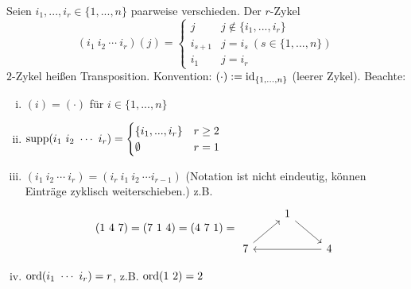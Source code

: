 \documentclass[a4paper]{report}
\begin{document}
\begin{defi}
  Seien $i_{1}, ..., i_{r} \in \{1, ..., n\}$ paarweise verschieden. Der $r$-Zykel \[(i_{1} \ i_{2}\ \cdots \ i_{r})(j) =
  \begin{cases}
    j & j \notin \{i_{1}, ..., i_{r}\} \\
    i_{s+1} & j = i_{s} \ (s \in \{1, ..., n\}) \\
    i_{1} & j = i_{r}
  \end{cases}\]
$2$-Zykel heißen Transposition.
Konvention: $( \cdot ):= \operatorname{id}_{\{1, ..., n\}}$ (leerer Zykel).
Beachte:
\begin{enumerate}[(i)]
  \item $(i) = (\cdot)$ für $i \in \{1, ..., n\}$
  \item $\operatorname{supp}(i_{1} \ i_{2} \ \cdots \ i_{r}) =
        \begin{cases}
          \{i_{1}, ..., i_{r}\} & r \ge 2 \\
          \emptyset & r =1
        \end{cases}$
  \item $(i_{1} \ i_{2}\ \cdots \ i_{r}) = (i_{r} \ i_{1} \ i_{2} \ \cdots i_{r-1})$ (Notation ist nicht eindeutig, können Einträge zyklisch weiterschieben.)
        z.B.
        \[(1 \ 4\ 7) = (7\ 1\ 4) = (4\ 7\ 1)
= \begin{tikzcd}
             & 1 \arrow[rd] &              \\
7 \arrow[ru] &              & 4 \arrow[ll]
\end{tikzcd}
        \]
  \item $\operatorname{ord}(i_{1}\ \cdots \ i_{r}) = r$, z.B. $\operatorname{ord}(1 \ 2) = 2$
\end{enumerate}
\end{defi}
\end{document}
